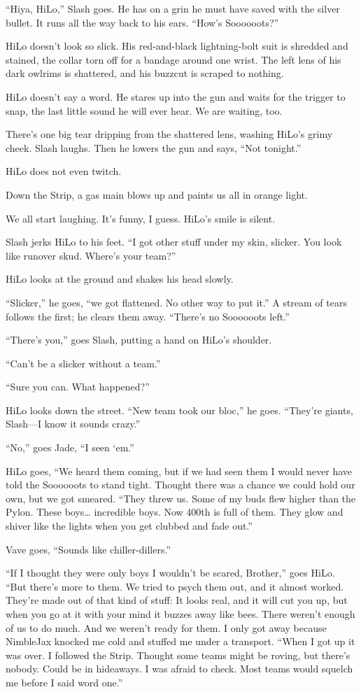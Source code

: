 “Hiya, HiLo,” Slash goes. He has on a grin he must have saved with the silver bullet. It runs all the way back to his ears. “How's Soooooots?”

HiLo doesn't look so slick. His red-and-black lightning-bolt suit is shredded and stained, the collar torn off for a bandage around one wrist. The left lens of his dark owlrims is shattered, and his buzzcut is scraped to nothing.

HiLo doesn't say a word. He stares up into the gun and waits for the trigger to snap, the last little sound he will ever hear. We are waiting, too.

There's one big tear dripping from the shattered lens, washing HiLo's grimy cheek. Slash laughs. Then he lowers the gun and says, “Not tonight.”

HiLo does not even twitch.

Down the Strip, a gas main blows up and paints us all in orange light.

We all start laughing. It's funny, I guess. HiLo's smile is silent.

Slash jerks HiLo to his feet. “I got other stuff under my skin, slicker. You look like runover skud. Where's your team?”

HiLo looks at the ground and shakes his head slowly.

``Slicker,” he goes, “we got flattened. No other way to put it.” A stream of tears follows the first; he clears them away. “There's no Soooooots left.”

``There's you,” goes Slash, putting a hand on HiLo's shoulder.

``Can't be a slicker without a team.”

``Sure you can. What happened?”

HiLo looks down the street. “New team took our bloc,” he goes. “They're giants, Slash—I know it sounds crazy.”

``No,” goes Jade, “I seen ‘em.”

HiLo goes, “We heard them coming, but if we had seen them I would never have told the Soooooots to stand tight. Thought there was a chance we could hold our own, but we got smeared. “They threw us. Some of my buds flew higher than the Pylon. These boys… incredible boys. Now 400th is full of them. They glow and shiver like the lights when you get clubbed and fade out.”

Vave goes, “Sounds like chiller-dillers.”

``If I thought they were only boys I wouldn't be scared, Brother,” goes HiLo. “But there's more to them. We tried to psych them out, and it almost worked. They're made out of that kind of stuff: It looks real, and it will cut you up, but when you go at it with your mind it buzzes away like bees. There weren't enough of us to do much. And we weren't ready for them. I only got away because NimbleJax knocked me cold and stuffed me under a transport.
“When I got up it was over. I followed the Strip. Thought some teams might be roving, but there's nobody. Could be in hideaways. I was afraid to check. Most teams would squelch me before I said word one.”

